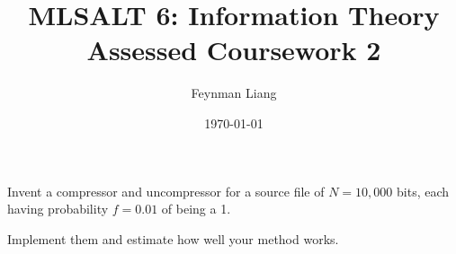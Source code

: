 \documentclass[a4paper,oneside,reqno]{hmcpset}
\newcommand{\authorname}{Feynman Liang}
\newcommand{\coursename}{MLSALT 6: Information Theory}
\newcommand{\assignmentname}{Assessed Coursework 2}
\begin{document}
\title{\coursename\\\assignmentname}
\author{\authorname}
\date{\today}


\begin{problem}
  Invent a compressor and uncompressor for a source file of $N=10,000$ bits,
  each having probability $f = 0.01$ of being a 1.

  Implement them and estimate how well your method works.
\end{problem}

\begin{solution}
\end{solution}
\end{document}
